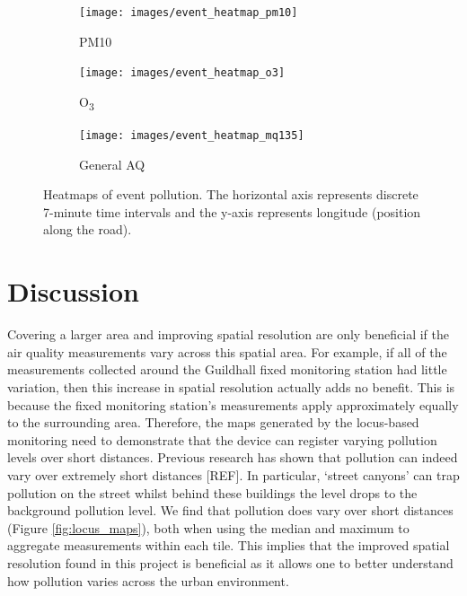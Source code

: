 \documentclass[11pt,twosided,a4paper]{report}
\begin{document}
\begin{figure}[!tb]
    \centering
    \begin{minipage}{1\linewidth}
            \begin{subfigure}[t]{.5\linewidth}
                \texttt{[image: images/event\_heatmap\_pm10]}
                \caption{PM10}
                \label{fig:event_heatmap_pm10}
            \end{subfigure}
            \begin{subfigure}[t]{.5\linewidth}
            	\texttt{[image: images/event\_heatmap\_o3]}
            	\caption{O\textsubscript{3}}
            	\label{fig:event_heatmap_o3}
	   \end{subfigure}
        \end{minipage}
    \begin{minipage}{1\linewidth}
    	\centering
            \begin{subfigure}[t]{.5\linewidth}
                \texttt{[image: images/event\_heatmap\_mq135]}
                \caption{General AQ}
                \label{fig:event_heatmap_mq135}
            \end{subfigure}
        \end{minipage}
    \caption[Heatmaps of event pollution.]{Heatmaps of event pollution. The horizontal axis represents discrete 7-minute time intervals and the y-axis represents longitude (position along the road).}
    \label{fig:event_heatmaps}
\end{figure}

\section{Discussion}

Covering a larger area and improving spatial resolution are only beneficial if the air quality measurements vary across this spatial area. For example, if all of the measurements collected around the Guildhall fixed monitoring station had little variation, then this increase in spatial resolution actually adds no benefit. This is because the fixed monitoring station's measurements apply approximately equally to the surrounding area. Therefore, the maps generated by the locus-based monitoring need to demonstrate that the device can register varying pollution levels over short distances. Previous research has shown that pollution can indeed vary over extremely short distances [REF]. In particular, `street canyons' can trap pollution on the street whilst behind these buildings the level drops to the background pollution level. We find that pollution does vary over short distances (Figure \ref{fig:locus_maps}), both when using the median and maximum to aggregate measurements within each tile. This implies that the improved spatial resolution found in this project is beneficial as it allows one to better understand how pollution varies across the urban environment. 
\end{document}
